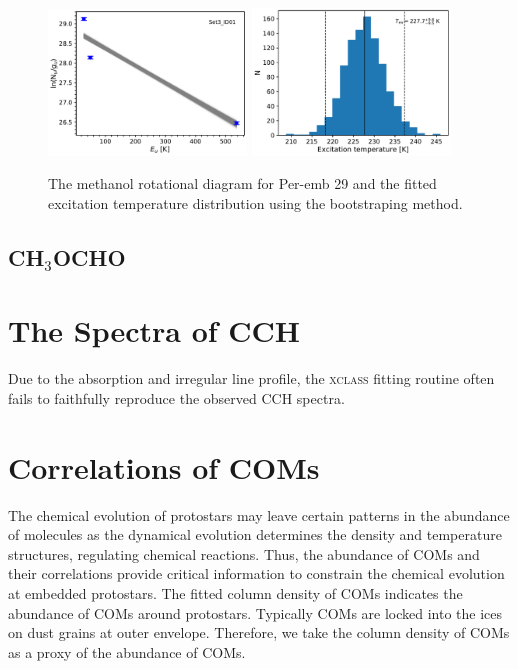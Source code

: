 \documentclass[twocolumn]{aastex62}
\newcommand{\methylformate}{\mbox{CH$_{3}$OCHO}}
\begin{document}
\begin{figure}[htbp!]
  \centering
  \includegraphics[width=0.47\textwidth]{Set3_ID01.pdf}
  \includegraphics[width=0.47\textwidth]{Set3_ID01_rot_temps.pdf}
  \caption{The methanol rotational diagram for Per-emb 29 and the fitted excitation temperature distribution using the bootstraping method.}
  \label{}
\end{figure}

\subsection{\methylformate}

\section{The Spectra of CCH}
Due to the absorption and irregular line profile, the \textsc{xclass} fitting routine often fails to faithfully reproduce the observed CCH spectra.

\section{Correlations of COMs}
The chemical evolution of protostars may leave certain patterns in the abundance of molecules as the dynamical evolution determines the density and temperature structures, regulating chemical reactions.  Thus, the abundance of COMs and their correlations provide critical information to constrain the chemical evolution at embedded protostars.  The fitted column density of COMs indicates the abundance of COMs around protostars.  Typically COMs are locked into the ices on dust grains at outer envelope. Therefore, we take the column density of COMs as a proxy of the abundance of COMs.  
\end{document}
